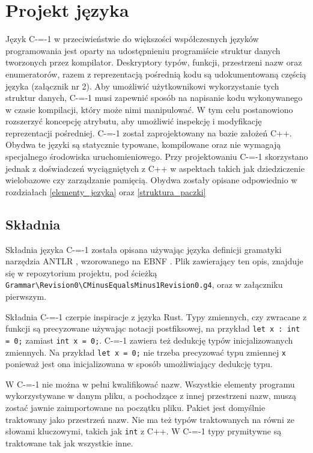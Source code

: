 \section{Projekt języka}
\label{Language_desig}

Język C-=-1 w przeciwieństwie do większości współczesnych języków programowania jest oparty na udostępnieniu programiście struktur danych tworzonych przez kompilator. Deskryptory typów, funkcji, przestrzeni nazw oraz enumeratorów, razem z reprezentacją pośrednią kodu są udokumentowaną częścią języka (załącznik nr 2).
Aby umożliwić użytkownikowi wykorzystanie tych struktur danych, C-=-1 musi zapewnić sposób na napisanie kodu wykonywanego w czasie kompilacji, który może nimi manipulować. W tym celu postanowiono rozszerzyć koncepcję atrybutu, aby umożliwić inspekcję i modyfikację reprezentacji pośredniej.
C-=-1 został zaprojektowany na bazie założeń C++. Obydwa te języki są statycznie typowane, kompilowane oraz nie wymagają specjalnego środowiska uruchomieniowego.
Przy projektowaniu C-=-1 skorzystano jednak z doświadczeń wyciągniętych z C++ w aspektach takich jak dziedziczenie wielobazowe czy zarządzanie pamięcią. Obydwa zostały opisane odpowiednio w rozdziałach \ref{elementy_jezyka} oraz \ref{struktura_paczki}

\subsection{Składnia}

Składnia języka C-=-1 została opisana używając języka definicji gramatyki narzędzia ANTLR \cite{antlr}, wzorowanego na EBNF \cite{ebnf}.
Plik zawierający ten opis, znajduje się w repozytorium projektu, pod ścieżką \lstinline{Grammar\Revision0\CMinusEqualsMinus1Revision0.g4}, oraz w załączniku pierwszym.

Składnia C-=-1 czerpie inspiracje z języka Rust.
Typy zmiennych, czy zwracane z funkcji są precyzowane używając notacji postfiksowej, na przykład \lstinline{let x : int = 0;} zamiast \lstinline{int x = 0;}.
C-=-1 zawiera też dedukcję typów inicjalizowanych zmiennych.
Na przykład \lstinline{let x = 0;} nie trzeba precyzować typu zmiennej \lstinline{x} ponieważ jest ona inicjalizowana w sposób umożliwiający dedukcję typu.

W C-=-1 nie można w pełni kwalifikować nazw.
Wszystkie elementy programu wykorzystywane w danym pliku, a pochodzące z innej przestrzeni nazw, muszą zostać jawnie zaimportowane na początku pliku.
Pakiet jest domyślnie traktowany jako przestrzeń nazw.
Nie ma też typów traktowanych na równi ze słowami kluczowymi, takich jak \lstinline{int} z C++.
W C-=-1 typy prymitywne są traktowane tak jak wszystkie inne.

